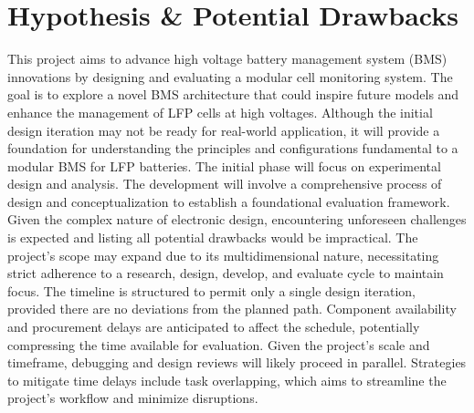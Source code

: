 \section{Hypothesis \& Potential Drawbacks}\label{sec:drawbacks}
This project aims to advance high voltage battery management system (BMS) innovations by designing and evaluating a modular cell monitoring system. The goal is to explore a novel BMS architecture that could inspire future models and enhance the management of LFP cells at high voltages. Although the initial design iteration may not be ready for real-world application, it will provide a foundation for understanding the principles and configurations fundamental to a modular BMS for LFP batteries. The initial phase will focus on experimental design and analysis.\newline\newline
\noindent
The development will involve a comprehensive process of design and conceptualization to establish a foundational evaluation framework. Given the complex nature of electronic design, encountering unforeseen challenges is expected and listing all potential drawbacks would be impractical. The project's scope may expand due to its multidimensional nature, necessitating strict adherence to a research, design, develop, and evaluate cycle to maintain focus. The timeline is structured to permit only a single design iteration, provided there are no deviations from the planned path.\newline\newline
\noindent
Component availability and procurement delays are anticipated to affect the schedule, potentially compressing the time available for evaluation. Given the project's scale and timeframe, debugging and design reviews will likely proceed in parallel. Strategies to mitigate time delays include task overlapping, which aims to streamline the project's workflow and minimize disruptions.




\vfill
